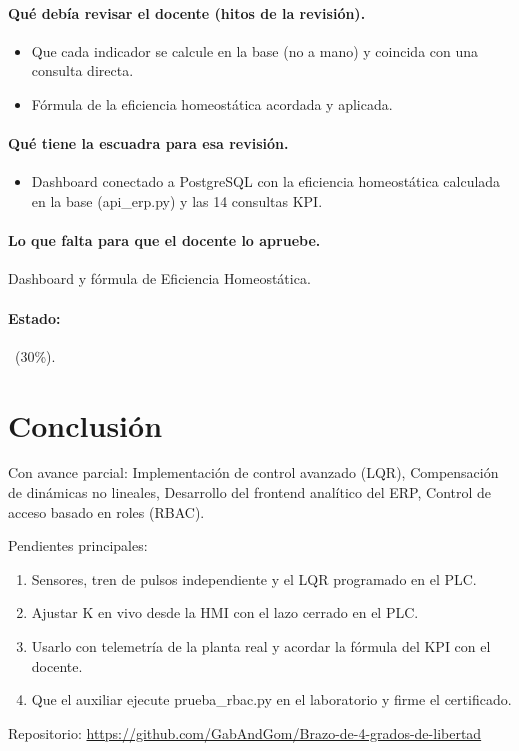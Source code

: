 \documentclass[a4paper,11pt]{article}
\begin{document}
\paragraph{Qué debía revisar el docente (hitos de la revisión).}
\begin{itemize}
\item[$\square$] Que cada indicador se calcule en la base (no a mano) y coincida con una consulta directa.
\item[$\square$] Fórmula de la eficiencia homeostática acordada y aplicada.
\end{itemize}
\paragraph{Qué tiene la escuadra para esa revisión.}
\begin{itemize}
\item Dashboard conectado a PostgreSQL con la eficiencia homeostática calculada en la base (api\_erp.py) y las 14 consultas KPI.
\end{itemize}
\paragraph{Lo que falta para que el docente lo apruebe.} Dashboard y fórmula de Eficiencia Homeostática.
\paragraph{Estado:} \parcial~(30\%).
\section{Conclusión}
Con avance parcial: Implementación de control avanzado (LQR), Compensación de dinámicas no lineales, Desarrollo del frontend analítico del ERP, Control de acceso basado en roles (RBAC).
\par\smallskip Pendientes principales:
\begin{enumerate}
\item Sensores, tren de pulsos independiente y el LQR programado en el PLC.
\item Ajustar K en vivo desde la HMI con el lazo cerrado en el PLC.
\item Usarlo con telemetría de la planta real y acordar la fórmula del KPI con el docente.
\item Que el auxiliar ejecute prueba\_rbac.py en el laboratorio y firme el certificado.
\end{enumerate}
\par\smallskip\noindent Repositorio: \url{https://github.com/GabAndGom/Brazo-de-4-grados-de-libertad}
\end{document}

